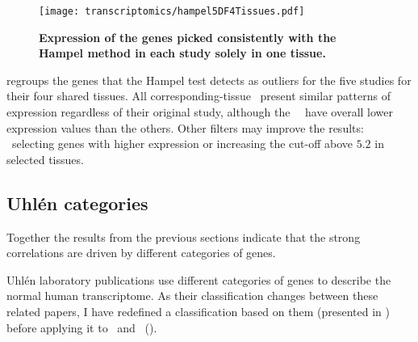 \begin{figure}[!htbp]
    \texttt{[image: transcriptomics/hampel5DF4Tissues.pdf]}\centering
    \caption[Expression of the genes picked with Hampel method]{\label{fig:hampelExp}%
    \textbf{Expression of the genes picked consistently with the Hampel method
    in each study solely in one tissue.}}
\end{figure}

 regroups the genes that the Hampel test detects
as outliers for the five studies for their four shared tissues.
All corresponding-tissue \treps\ present similar patterns of expression
regardless of their original study,
although the \castle\ \treps\ have overall lower expression values than the others.
Other filters may improve the results:
\eg\ selecting genes with higher expression or
increasing the cut-off above $5.2$ in selected tissues.\mybr\

\vspace{-4mm}
\subsection{Uhlén categories}\label{sub:UhlenGeneCat}
\vspace{-7mm}
Together the results from the previous sections indicate that
the strong correlations are driven by different categories of genes.\mybr\

Uhlén laboratory publications 
use different categories of genes to describe the normal human transcriptome.
As their classification changes between these related papers,
I have redefined a classification based on them
(presented in )
before applying it to \setOne\ and \setTwo\ ().\mybr\


